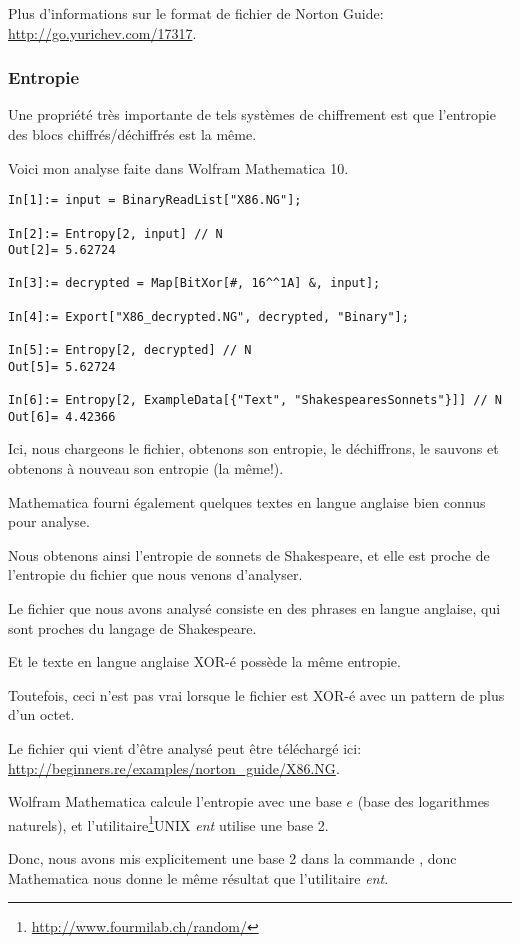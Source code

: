 Plus d'informations sur le format de fichier de Norton Guide: \url{http://go.yurichev.com/17317}.

\subsubsection{Entropie}

Une propriété très importante de tels systèmes de chiffrement est que l'entropie
des blocs chiffrés/déchiffrés est la même.

Voici mon analyse faite dans Wolfram Mathematica 10.

\begin{lstlisting}[caption=Wolfram Mathematica 10,style=custommath]
In[1]:= input = BinaryReadList["X86.NG"];

In[2]:= Entropy[2, input] // N
Out[2]= 5.62724

In[3]:= decrypted = Map[BitXor[#, 16^^1A] &, input];

In[4]:= Export["X86_decrypted.NG", decrypted, "Binary"];

In[5]:= Entropy[2, decrypted] // N
Out[5]= 5.62724

In[6]:= Entropy[2, ExampleData[{"Text", "ShakespearesSonnets"}]] // N
Out[6]= 4.42366
\end{lstlisting}

Ici, nous chargeons le fichier, obtenons son entropie, le déchiffrons, le sauvons
et obtenons à nouveau son entropie (la même!).

Mathematica fourni également quelques textes en langue anglaise bien connus pour
analyse.

Nous obtenons ainsi l'entropie de sonnets de Shakespeare, et elle est proche de l'entropie
du fichier que nous venons d'analyser.

Le fichier que nous avons analysé consiste en des phrases en langue anglaise, qui
sont proches du langage de Shakespeare.

Et le texte en langue anglaise XOR-é possède la même entropie.

Toutefois, ceci n'est pas vrai lorsque le fichier est XOR-é avec un pattern de plus
d'un octet.

Le fichier qui vient d'être analysé peut être téléchargé ici: \url{http://beginners.re/examples/norton_guide/X86.NG}.


\newcommand{\FNENTURL}{\footnote{\url{http://www.fourmilab.ch/random/}}}

Wolfram Mathematica calcule l'entropie avec une base $e$ (base des logarithmes naturels),
et l'utilitaire\FNENTURL UNIX \emph{ent} utilise une base 2.

Donc, nous avons mis explicitement une base 2 dans la commande , donc
Mathematica nous donne le même résultat que l'utilitaire \emph{ent}.

